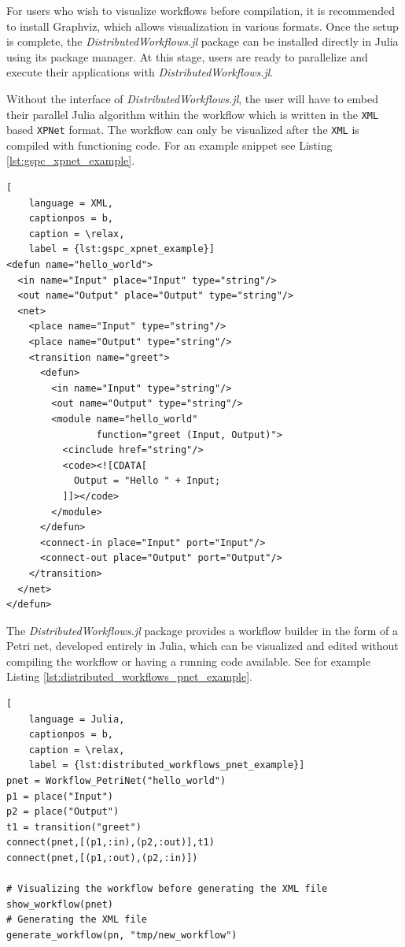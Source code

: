 \documentclass{juliacon}
\begin{document}
For users who wish to visualize workflows before compilation, it is recommended to install Graphviz\cite{Graphviz81:online}, which allows visualization in various formats. 
Once the setup is complete, the \emph{DistributedWorkflows.jl} package can be installed directly in Julia using its package manager. 
At this stage, users are ready to parallelize and execute their applications with \emph{DistributedWorkflows.jl}.\vskip 6pt

Without the interface of \emph{DistributedWorkflows.jl}, the user will have to embed their parallel Julia algorithm within the workflow which is written in the \verb+XML+ based \verb+XPNet+ format. 
The workflow can only be visualized after the \verb+XML+ is compiled with functioning code.
For an example snippet see Listing \ref{lst:gspc_xpnet_example}.

\begin{lstlisting}[
    language = XML,
    captionpos = b,
    caption = \relax,
    label = {lst:gspc_xpnet_example}]
<defun name="hello_world">
  <in name="Input" place="Input" type="string"/>
  <out name="Output" place="Output" type="string"/>
  <net>
    <place name="Input" type="string"/>
    <place name="Output" type="string"/>
    <transition name="greet">
      <defun>
        <in name="Input" type="string"/>
        <out name="Output" type="string"/>
        <module name="hello_world" 
                function="greet (Input, Output)">
          <cinclude href="string"/>
          <code><![CDATA[
            Output = "Hello " + Input;
          ]]></code>
        </module>
      </defun>
      <connect-in place="Input" port="Input"/>
      <connect-out place="Output" port="Output"/>
    </transition>
  </net>
</defun>
\end{lstlisting}

The \emph{DistributedWorkflows.jl} package provides a workflow builder in the form of a Petri net, developed entirely in Julia, which can be visualized and edited without compiling the workflow or having a running code available. See for example Listing \ref{lst:distributed_workflows_pnet_example}.

\begin{lstlisting}[
    language = Julia,
    captionpos = b,
    caption = \relax,
    label = {lst:distributed_workflows_pnet_example}]
pnet = Workflow_PetriNet("hello_world")
p1 = place("Input")
p2 = place("Output")
t1 = transition("greet")
connect(pnet,[(p1,:in),(p2,:out)],t1)
connect(pnet,[(p1,:out),(p2,:in)])

# Visualizing the workflow before generating the XML file
show_workflow(pnet)
# Generating the XML file
generate_workflow(pn, "tmp/new_workflow")
\end{lstlisting}
\end{document}
